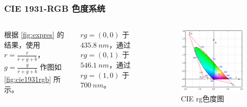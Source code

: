 \documentclass[8pt, aspectratio=169]{ctexbeamer}
\begin{document}
\begin{frame}
	\frametitle{CIE 1931-RGB 色度系统}

	\begin{columns}
		根据 \autoref{fig:expres} 的结果，使用 $r=\frac{\overline{r}}{\overline{r}+\overline{g}+\overline{b}}$， $g=\frac{\overline{g}}{\overline{r}+\overline{g}+\overline{b}}$ 作图如 \autoref{fig:cie1931rgb} 所示。

		$rg=(0,0)$ 于 $\SI{435.8}{nm}$，通过 $rg=(0,1)$ 于$\SI{546.1}{nm}$，通过 $rg=(1,0)$ 于 $\SI{700}{nm}$。

		\begin{figure}
			\includegraphics[width=0.6\linewidth]{cie1931.png}
			\caption{CIE rg色度图}
			\label{fig:cie1931rgb}
		\end{figure}
	\end{columns}

\end{frame}
\end{document}
